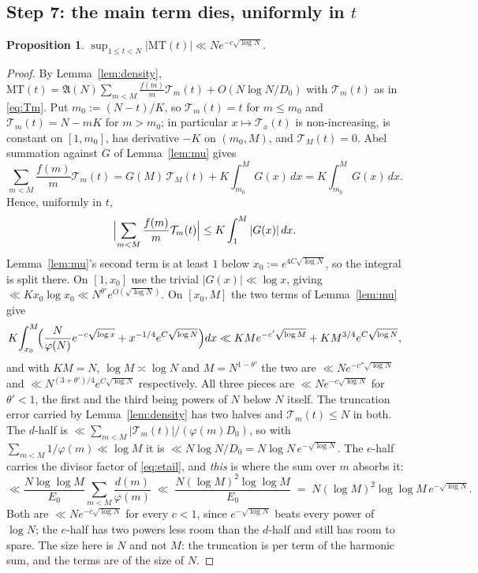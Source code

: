 \documentclass[11pt,a4paper]{article}
\theoremstyle{plain}
\newtheorem{proposition}[theorem]{Proposition}
\theoremstyle{definition}
\theoremstyle{remark}
\newcommand{\AAA}{\mathfrak{A}}
\newcommand{\Tcut}{\mathcal T}
\begin{document}
\subsection{Step 7: the main term dies, uniformly in
\texorpdfstring{$t$}{t}}

\begin{proposition}\label{prop:MT}
$\displaystyle\sup_{1\le t<N}|\mathrm{MT}(t)|\ll Ne^{-c\sqrt{\log N}}$.
\end{proposition}

\begin{proof}
By Lemma~\ref{lem:density},
$\mathrm{MT}(t)=\AAA(N)\sum_{m<M}\frac{f(m)}{m}\Tcut_m(t)
+O(N\log N/D_0)$ with $\Tcut_m(t)$ as in \eqref{eq:Tm}. Put
$m_0:=(N-t)/K$, so $\Tcut_m(t)=t$ for $m\le m_0$ and
$\Tcut_m(t)=N-mK$ for
$m>m_0$; in particular $x\mapsto\Tcut_x(t)$ is non-increasing, is
constant on $[1,m_0]$, has derivative $-K$ on $(m_0,M)$, and
$\Tcut_M(t)=0$. Abel summation against $G$ of Lemma~\ref{lem:mu} gives
\[
  \sum_{m<M}\frac{f(m)}{m}\Tcut_m(t)
  = G(M)\,\Tcut_M(t)+K\!\int_{m_0}^{M}\!G(x)\,dx
  = K\!\int_{m_0}^{M}\!G(x)\,dx .
\]
Hence, uniformly in $t$,
\[
  \Bigl|\sum_{m<M}\frac{f(m)}{m}\Tcut_m(t)\Bigr|
  \le K\int_{1}^{M}|G(x)|\,dx .
\]
Lemma~\ref{lem:mu}'s second term is at least $1$ below
$x_0:=e^{4C\sqrt{\log N}}$, so the integral is split there. On
$[1,x_0]$ use the trivial $|G(x)|\ll\log x$, giving
$\ll Kx_0\log x_0\ll N^{\theta'}e^{O(\sqrt{\log N})}$. On $[x_0,M]$ the
two terms of Lemma~\ref{lem:mu} give
\[
  K\!\int_{x_0}^{M}\!\Bigl(\frac{N}{\varphi(N)}e^{-c\sqrt{\log x}}
    +x^{-1/4}e^{C\sqrt{\log N}}\Bigr)dx
  \ll KMe^{-c'\sqrt{\log M}}+KM^{3/4}e^{C\sqrt{\log N}},
\]
and with $KM=N$, $\log M\asymp\log N$ and $M=N^{1-\theta'}$ the two are
$\ll Ne^{-c''\sqrt{\log N}}$ and $\ll N^{(3+\theta')/4}e^{C\sqrt{\log N}}$
respectively. All three pieces are $\ll Ne^{-c\sqrt{\log N}}$ for
$\theta'<1$, the first and the third being powers of $N$ below $N$
itself. The truncation error carried by
Lemma~\ref{lem:density} has two halves and $\Tcut_m(t)\le N$ in both.
The $d$-half is $\ll\sum_{m<M}|\Tcut_m(t)|/(\varphi(m)D_0)$, so with
$\sum_{m<M}1/\varphi(m)\ll\log M$ it is
$\ll N\log N/D_0=N\log N\,e^{-\sqrt{\log N}}$. The $e$-half carries the
divisor factor of \eqref{eq:etail}, and \emph{this} is where the sum
over $m$ absorbs it:
\[
  \ll\frac{N\log\log M}{E_0}\sum_{m<M}\frac{d(m)}{\varphi(m)}
  \;\ll\;\frac{N(\log M)^{2}\log\log M}{E_0}
  \;=\;N(\log M)^{2}\log\log M\,e^{-\sqrt{\log N}} .
\]
Both are $\ll Ne^{-c\sqrt{\log N}}$ for every $c<1$, since
$e^{-\sqrt{\log N}}$ beats every power of $\log N$; the $e$-half has
two powers less room than the $d$-half and still has room to spare.
The size here is $N$ and not
$M$: the truncation is per term of the harmonic sum, and the terms are
of the size of $N$.
\end{proof}
\end{document}

